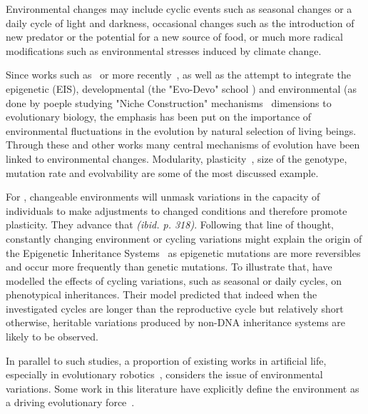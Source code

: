 
Environmental changes may include cyclic events such as seasonal changes or a daily cycle of light and darkness, occasional changes such as the introduction of new predator or the potential for a new source of food, or much more radical modifications such as environmental stresses induced by climate change.

Since works such as~\citep{levins1968evolution} or more recently~\citep{jablonka2014evolution}, as well as the attempt to integrate the epigenetic (EIS), developmental (the "Evo-Devo" school \citep{muller2007evodevoextendingtheevolutionarysynthesis}) and environmental (as done by poeple studying "Niche Construction" mechanisms~\citep{laland2016anintroductiontonicheconstructiontheory} dimensions to evolutionary biology, the emphasis has been put on the importance of environmental fluctuations in the evolution by natural selection of living beings. Through these and other works many central mechanisms of evolution have been linked to environmental changes. Modularity, plasticity~\citep{west2005developmental}, size of the genotype, mutation rate and evolvability are some of the most discussed example. 

For \cite{jablonka2014evolution}, changeable environments will unmask variations in the capacity of individuals to make adjustments to changed conditions and therefore promote plasticity. They advance that \emph{(ibid. p. 318)}. Following that line of thought, constantly changing environment or cycling variations might explain the origin of the Epigenetic Inheritance Systems~\cite{heard2014transgenerationalepigeneticinheritancemythsandmechanisms} as epigenetic mutations are more reversibles and occur more frequently than genetic mutations. To illustrate that, \cite{lachmann1996inheritance} have modelled the effects of cycling variations, such as seasonal or daily cycles, on phenotypical inheritances. Their model predicted that indeed when the investigated cycles are longer than the reproductive cycle but relatively short otherwise, heritable variations produced by non-DNA inheritance systems are likely to be observed. 

In parallel to such studies, a proportion of existing works in artificial life, especially in evolutionary robotics~\citep{floreano2000evolutionary}, considers the issue of environmental variations. Some work in this literature have explicitly define the environment as a driving evolutionary force~\citep{bredeche2012environmentdrivenopenende}. %

